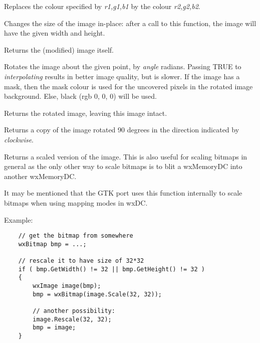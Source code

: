 Replaces the colour specified by {\it r1,g1,b1} by the colour {\it r2,g2,b2}.

\label{wximagerescale}


Changes the size of the image in-place: after a call to this function, the
image will have the given width and height.

Returns the (modified) image itself.



\label{wximagerotate}


Rotates the image about the given point, by {\it angle} radians. Passing TRUE
to {\it interpolating} results in better image quality, but is slower. If the
image has a mask, then the mask colour is used for the uncovered pixels in the
rotated image background. Else, black (rgb 0, 0, 0) will be used.

Returns the rotated image, leaving this image intact.

\label{wximagerotate90}


Returns a copy of the image rotated 90 degrees in the direction
indicated by {\it clockwise}.

\label{wximagescale}


Returns a scaled version of the image. This is also useful for
scaling bitmaps in general as the only other way to scale bitmaps
is to blit a wxMemoryDC into another wxMemoryDC.

It may be mentioned that the GTK port uses this function internally
to scale bitmaps when using mapping modes in wxDC. 

Example:

\begin{verbatim}
    // get the bitmap from somewhere
    wxBitmap bmp = ...;

    // rescale it to have size of 32*32
    if ( bmp.GetWidth() != 32 || bmp.GetHeight() != 32 )
    {
        wxImage image(bmp);
        bmp = wxBitmap(image.Scale(32, 32));

        // another possibility:
        image.Rescale(32, 32);
        bmp = image;
    }

\end{verbatim}

